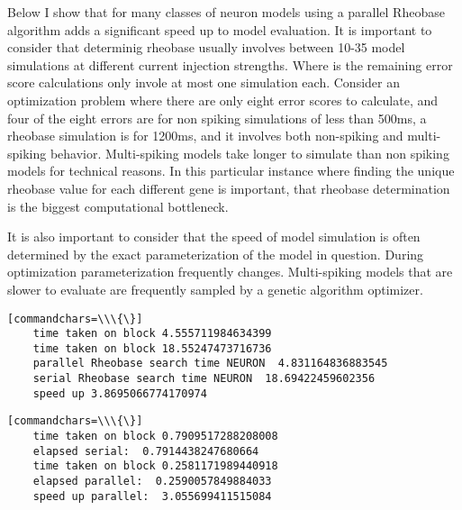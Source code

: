   

    
    Below I show that for many classes of neuron models using a parallel
Rheobase algorithm adds a significant speed up to model evaluation. It
is important to consider that determinig rheobase usually involves
between 10-35 model simulations at different current injection
strengths. Where is the remaining error score calculations only invole
at most one simulation each. Consider an optimization problem where
there are only eight error scores to calculate, and four of the eight
errors are for non spiking simulations of less than 500ms, a rheobase
simulation is for 1200ms, and it involves both non-spiking and
multi-spiking behavior. Multi-spiking models take longer to simulate
than non spiking models for technical reasons. In this particular
instance where finding the unique rheobase value for each different gene
is important, that rheobase determination is the biggest computational
bottleneck.

It is also important to consider that the speed of model simulation is
often determined by the exact parameterization of the model in question.
During optimization parameterization frequently changes. Multi-spiking
models that are slower to evaluate are frequently sampled by a genetic
algorithm optimizer.

\begin{verbatim}[commandchars=\\\{\}]
    time taken on block 4.555711984634399
    time taken on block 18.55247473716736
    parallel Rheobase search time NEURON  4.831164836883545
    serial Rheobase search time NEURON  18.69422459602356
    speed up 3.8695066774170974
\end{verbatim}

\begin{verbatim}[commandchars=\\\{\}]
    time taken on block 0.7909517288208008
    elapsed serial:  0.7914438247680664
    time taken on block 0.2581171989440918
    elapsed parallel:  0.2590057849884033
    speed up parallel:  3.055699411515084
\end{verbatim}



